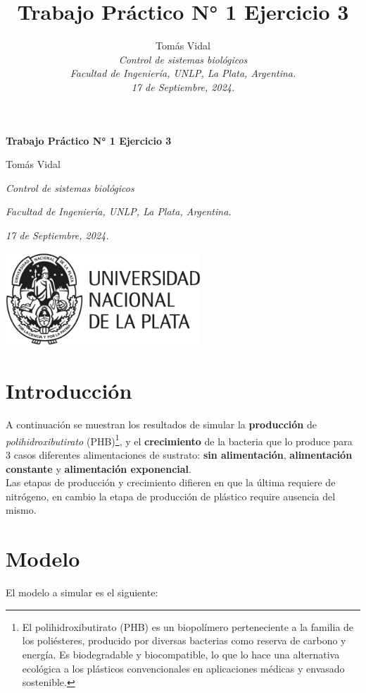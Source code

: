 \documentclass[letterpaper, 10 pt, conference]{ieeeconf}  %
\title{\LARGE \bf Trabajo Práctico N° 1 Ejercicio 3}
\author{
  Tom\'as Vidal\\
  {\it Control de sistemas biológicos}\\
  {\it Facultad de Ingenier\'ia, UNLP, La Plata, Argentina.}\\
  {\it 17 de Septiembre, 2024.}
}                                            %
\begin{document}
\begin{titlepage}
	\centering
	\null\vspace{4cm} %
	{\LARGE \textbf{Trabajo Práctico N° 1 Ejercicio 3} \par}
	\vspace{2cm}
	{\large Tomás Vidal \par}
	{\itshape Control de sistemas biológicos \par}
	{\itshape Facultad de Ingeniería, UNLP, La Plata, Argentina. \par}
	{\itshape 17 de Septiembre, 2024. \par}
	\vspace{2cm}
	\includegraphics[width=0.55\textwidth]{unlp_logo.png}
	\vfill %
\end{titlepage}

\section{Introducción}
A continuación se muestran los resultados de simular la \textbf{producción} de \textit{polihidroxibutirato} (PHB)\footnote{El polihidroxibutirato (PHB) es un biopolímero perteneciente a la familia de los poliésteres, producido por diversas bacterias como reserva de carbono y energía. Es biodegradable y biocompatible, lo que lo hace una alternativa ecológica a los plásticos convencionales en aplicaciones médicas y envasado sostenible.}, y el \textbf{crecimiento} de la bacteria que lo produce para 3 casos diferentes alimentaciones de sustrato: \textbf{sin alimentación}, \textbf{alimentación constante} y \textbf{alimentación exponencial}. \\
Las etapas de producción y crecimiento difieren en que la última requiere de nitrógeno, en cambio la etapa de producción de plástico require ausencia del mismo.

\section{Modelo}
El modelo a simular es el siguiente:
\end{document}
